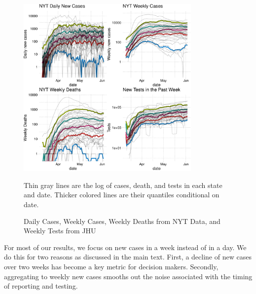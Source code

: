 \documentclass[11pt,reqno,letter]{amsart}
\theoremstyle{definition}
\begin{document}
\begin{figure}[!ht]\caption{Daily Cases, Weekly Cases,  Weekly Deaths from NYT Data, and Weekly Tests from JHU\label{fig:casedeathtest}}\smallskip
  \centering
  \begin{minipage}{\textwidth}
    \centering
    \includegraphics[width=0.8\textwidth,height=0.7\textwidth]{tables_and_figures/casesdeaths_q}
  \end{minipage}
     \begin{flushleft}
      \footnotesize Thin gray lines are the log of cases, death, and tests  in each
      state and date. Thicker colored lines are their quantiles conditional on date.
      \end{flushleft}
\end{figure}





For most of our results, we focus on new cases in a week instead of in
a day. We do this for two reasons as discussed in the main text. First, a decline of new cases over
two weeks has become a key metric for decision makers. Secondly, aggregating to weekly new cases smooths out the noise associated with  the timing of
reporting and testing.
\end{document}
